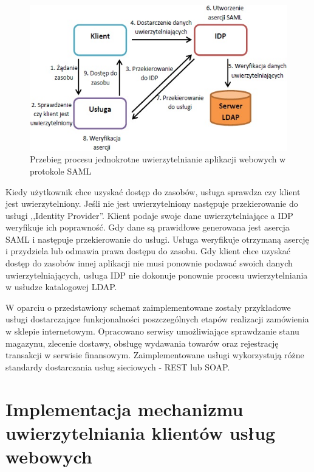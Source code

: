 	\begin{figure}[h]
		\centering
		\includegraphics{img/samlWebSSO.jpg}
		\caption{Przebieg procesu jednokrotne uwierzytelnianie aplikacji webowych w protokole SAML}
		\label{samlSSOSteps}
	\end{figure}
		
	Kiedy użytkownik chce uzyskać dostęp do zasobów, usługa sprawdza czy klient jest uwierzytelniony. Jeśli nie jest uwierzytelniony następuje przekierowanie do usługi ,,Identity Provider''. Klient podaje swoje dane uwierzytelniające a IDP weryfikuje ich poprawność. Gdy dane są prawidłowe generowana jest asercja SAML i następuje przekierowanie do usługi. Usługa weryfikuje otrzymaną asercję i przydziela lub odmawia prawa dostępu do zasobu. Gdy klient chce uzyskać dostęp do zasobów innej aplikacji nie musi ponownie podawać swoich danych uwierzytelniających, usługa IDP nie dokonuje ponownie procesu uwierzytelniania w usłudze katalogowej LDAP.
	
	W oparciu o przedstawiony schemat zaimplementowane zostały przykładowe usługi dostarczające funkcjonalności poszczególnych etapów realizacji zamówienia w sklepie internetowym. Opracowano serwisy umożliwiające sprawdzanie stanu magazynu, zlecenie dostawy, obsługę wydawania towarów oraz rejestrację transakcji w serwisie finansowym. Zaimplementowane usługi wykorzystują różne standardy dostarczania usług sieciowych - REST lub SOAP. 


\section{Implementacja mechanizmu uwierzytelniania klientów usług webowych}

